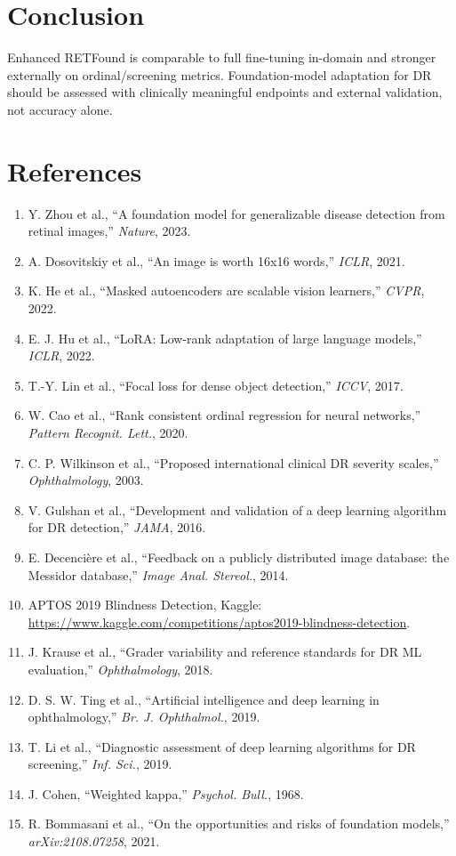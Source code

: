 \documentclass[10pt,twocolumn]{article}
\begin{document}
\section{Conclusion}
Enhanced RETFound is comparable to full fine-tuning in-domain and stronger externally on ordinal/screening metrics. Foundation-model adaptation for DR should be assessed with clinically meaningful endpoints and external validation, not accuracy alone.

\section*{References}
\begin{enumerate}\itemsep0pt
  \item Y. Zhou et al., ``A foundation model for generalizable disease detection from retinal images,'' \textit{Nature}, 2023.
  \item A. Dosovitskiy et al., ``An image is worth 16x16 words,'' \textit{ICLR}, 2021.
  \item K. He et al., ``Masked autoencoders are scalable vision learners,'' \textit{CVPR}, 2022.
  \item E. J. Hu et al., ``LoRA: Low-rank adaptation of large language models,'' \textit{ICLR}, 2022.
  \item T.-Y. Lin et al., ``Focal loss for dense object detection,'' \textit{ICCV}, 2017.
  \item W. Cao et al., ``Rank consistent ordinal regression for neural networks,'' \textit{Pattern Recognit. Lett.}, 2020.
  \item C. P. Wilkinson et al., ``Proposed international clinical DR severity scales,'' \textit{Ophthalmology}, 2003.
  \item V. Gulshan et al., ``Development and validation of a deep learning algorithm for DR detection,'' \textit{JAMA}, 2016.
  \item E. Decenci\`ere et al., ``Feedback on a publicly distributed image database: the Messidor database,'' \textit{Image Anal. Stereol.}, 2014.
  \item APTOS 2019 Blindness Detection, Kaggle: \url{https://www.kaggle.com/competitions/aptos2019-blindness-detection}.
  \item J. Krause et al., ``Grader variability and reference standards for DR ML evaluation,'' \textit{Ophthalmology}, 2018.
  \item D. S. W. Ting et al., ``Artificial intelligence and deep learning in ophthalmology,'' \textit{Br. J. Ophthalmol.}, 2019.
  \item T. Li et al., ``Diagnostic assessment of deep learning algorithms for DR screening,'' \textit{Inf. Sci.}, 2019.
  \item J. Cohen, ``Weighted kappa,'' \textit{Psychol. Bull.}, 1968.
  \item R. Bommasani et al., ``On the opportunities and risks of foundation models,'' \textit{arXiv:2108.07258}, 2021.
\end{enumerate}
\end{document}
